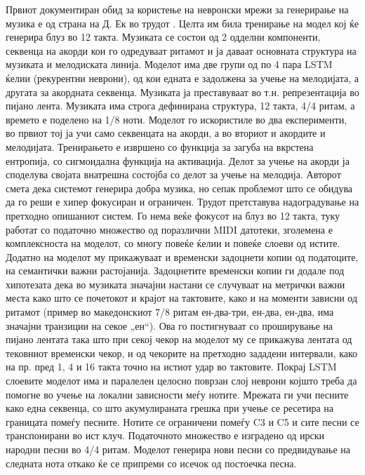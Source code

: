 Првиот документиран обид за користење на невронски мрежи за генерирање на музика е од страна на Д. Ек во трудот \cite{Eck2002}. Целта им била тренирање на модел кој ќе генерира блуз во 12 такта. Музиката се состои од 2 одделни компоненти, секвенца на акорди кои го одредуваат ритамот и ја даваат основната структура на музиката и мелодиската линија. Моделот има две групи од по 4 пара LSTM ќелии (рекурентни неврони), од кои едната е задолжена за учење на мелодијата, а другата за акордната секвенца. Музиката ја преставуваат во т.н. репрезентација во пијано лента. Музиката има строга дефинирана структура, 12 такта, 4/4 ритам, а времето е поделено на 1/8 ноти. Моделот го искористиле во два експерименти, во првиот тој ја учи само секвенцата на акорди, а во вториот и акордите и мелодијата. Тренирањето е извршено со функција за загуба на вкрстена ентропија, со сигмоидална функција на активација. Делот за учење на акорди ја споделува својата внатрешна состојба со делот за учење на мелодија. Авторот смета дека системот генерира добра музика, но сепак проблемот што се обидува да го реши е хипер фокусиран и ограничен. Трудот \cite{Eck2008} претставува надоградување на претходно опишаниот систем. Го нема веќе фокусот на блуз во 12 такта, туку работат со податочно множество од поразлични MIDI датотеки, зголемена е комплексноста на моделот, со многу повеќе ќелии и повеќе слоеви од истите. Додатно на моделот му прикажуваат и временски задоцнети копии од податоците, на семантички важни растојанија. Задоцнетите временски копии ги додале под хипотезата дека во музиката значајни настани се случуваат на метрички важни места како што се почетокот и крајот на тактовите, како и на моменти зависни од ритамот (пример во македонскиот 7/8 ритам ен-два-три, ен-два, ен-два, има значајни транзиции на секое „ен“). Ова го постигнуваат со проширување на пијано лентата така што при секој чекор на моделот му се прикажува лентата од тековниот временски чекор, и од чекорите на претходно зададени интервали, како на пр. пред 1, 4 и 16 такта точно на истиот удар во тактовите. Покрај LSTM слоевите моделот има и паралелен целосно поврзан слој неврони којшто треба да помогне во учење на локални зависности меѓу нотите. Мрежата ги учи песните како една секвенца, со што акумулираната грешка при учење се ресетира на границата помеѓу песните. Нотите се ограничени помеѓу C3 и C5 и сите песни се транспонирани во ист клуч. Податочното множество е изградено од  ирски народни песни во 4/4 ритам. Моделот генерира нови песни со предвидување на следната нота откако ќе се припреми со исечок од постоечка песна.

